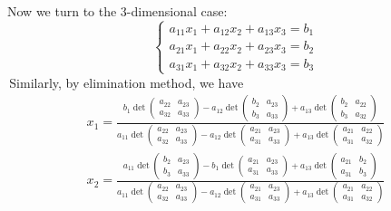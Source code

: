 Now we turn to the 3-dimensional case:
$$\begin{cases}
    a_{11}x_{1}+a_{12}x_2+a_{13}x_3=b_1\\
    a_{21}x_{1}+a_{22}x_2+a_{23}x_3=b_2\\
    a_{31}x_{1}+a_{32}x_2+a_{33}x_3=b_3
\end{cases}$$
\,Similarly, by elimination method, we have
$$\begin{aligned}
x_1 = \frac{b_1 \operatorname{det} \begin{pmatrix} a_{22} & a_{23} \\ a_{32} & a_{33} \end{pmatrix} - a_{12} \operatorname{det} \begin{pmatrix} b_2 & a_{23} \\ b_3 & a_{33} \end{pmatrix} + a_{13} \operatorname{det} \begin{pmatrix} b_2 & a_{22} \\ b_3 & a_{32} \end{pmatrix}}
           {a_{11} \operatorname{det} \begin{pmatrix} a_{22} & a_{23} \\ a_{32} & a_{33} \end{pmatrix} - a_{12} \operatorname{det} \begin{pmatrix} a_{21} & a_{23} \\ a_{31} & a_{33} \end{pmatrix} + a_{13} \operatorname{det} \begin{pmatrix} a_{21} & a_{22} \\ a_{31} & a_{32} \end{pmatrix}}\\
x_2 = \frac{a_{11} \operatorname{det} \begin{pmatrix} b_2 & a_{23} \\ b_3 & a_{33} \end{pmatrix} - b_1 \operatorname{det} \begin{pmatrix} a_{21} & a_{23} \\ a_{31} & a_{33} \end{pmatrix} + a_{13} \operatorname{det} \begin{pmatrix} a_{21} & b_2 \\ a_{31} & b_3 \end{pmatrix}}
           {a_{11} \operatorname{det} \begin{pmatrix} a_{22} & a_{23} \\ a_{32} & a_{33} \end{pmatrix} - a_{12} \operatorname{det} \begin{pmatrix} a_{21} & a_{23} \\ a_{31} & a_{33} \end{pmatrix} + a_{13} \operatorname{det} \begin{pmatrix} a_{21} & a_{22} \\ a_{31} & a_{32} \end{pmatrix}}\\

\end{aligned}$$
